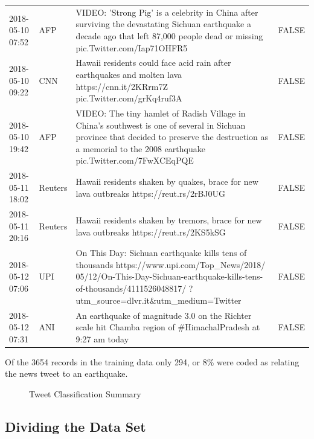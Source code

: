 \begin{table}
\begin{tabular}{ p{4cm} p{2cm} p{16cm} p{3cm} }
2018-05-10 07:52 &  AFP & VIDEO: 'Strong Pig' is a celebrity in China after surviving the devastating Sichuan earthquake a decade ago that left 87,000 people dead or missing pic.Twitter.com/Iap71OHFR5 & FALSE \\
2018-05-10 09:22 &  CNN & Hawaii residents could face acid rain after earthquakes and molten lava https://cnn.it/2KRrm7Z pic.Twitter.com/grKq4ruf3A & FALSE \\
2018-05-10 19:42 &  AFP & VIDEO: The tiny hamlet of Radish Village in China's southwest is one of several in Sichuan province that decided to preserve the destruction as a memorial to the 2008 earthquake pic.Twitter.com/7FwXCEqPQE & FALSE \\
2018-05-11 18:02 &  Reuters & Hawaii residents shaken by quakes, brace for new lava outbreaks https://reut.rs/2rBJ0UG & FALSE \\
2018-05-11 20:16 &  Reuters & Hawaii residents shaken by tremors, brace for new lava outbreaks https://reut.rs/2KS5kSG & FALSE \\
2018-05-12 07:06 &  UPI & On This Day: Sichuan earthquake kills tens of thousands https://www.upi.com/Top\_News/2018/ 05/12/On-This-Day-Sichuan-earthquake-kills-tens-of-thousands/4111526048817/ ?utm\_source=dlvr.it\&utm\_medium=Twitter & FALSE \\
2018-05-12 07:31 &  ANI & An earthquake of magnitude 3.0 on the Richter scale hit Chamba region of \#HimachalPradesh at 9:27 am today & FALSE \\
           \bottomrule
        \end{tabular}
        \hspace*{-2cm}
\end{table}

Of the 3654 records in the training data only 294, or 8\% were coded as relating the news tweet to an earthquake.

\begin{figure}[H]
\centering
 \caption{Tweet Classification Summary}
 \label{fig:classification}
\end{figure}

\subsection{Dividing the Data Set}

